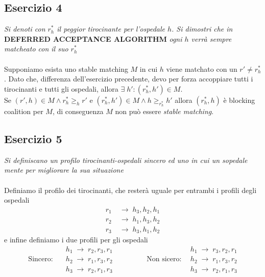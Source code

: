 \documentclass{article}
\begin{document}
        \subsection{Esercizio 4}
            \textit{Si denoti con $ r_h^* $ il peggior tirocinante per l'ospedale $ h $. Si dimostri che in} \textbf{DEFERRED ACCEPTANCE ALGORITHM} \textit{ogni $ h $ verrà sempre matcheato con il suo $ r_h^* $}\\
            \\
            Supponiamo esista uno stable matching $ M $ in cui $ h $ viene matchato con un $ r' \neq r_h^* $. Dato che, differenza dell'esercizio precedente, devo per forza accoppiare tutti i tirocinanti e tutti gli ospedali, allora $ \exists\; h' : (r_h^*, h') \in M $.\\
            Se $ (r', h) \in M \wedge r_h^* \geq_h r' $ e $ (r_h^*, h') \in M \wedge h \geq_{r_h^*} h' $ allora $ (r_h^*, h) $ è blocking coalition per $ M $, di conseguenza $ M $ non può essere \textit{stable matching}.
        \subsection{Esercizio 5}
            \textit{Si definiscano un profilo tirocinanti-ospedali sincero ed uno in cui un sopedale mente per migliorare la sua situazione}\\
            \\
            Definiamo il profilo dei tirocinanti, che resterà uguale per entrambi i profili degli ospedali
            \[
                \begin{aligned}
                    r_1\; &\rightarrow\; h_3, h_2, h_1 \\
                    r_2\; &\rightarrow\; h_1, h_3, h_2 \\
                    r_3\; &\rightarrow\; h_3, h_1, h_2 
                \end{aligned}  
            \]
            e infine definiamo i due profili per gli ospedali
            \[
                \begin{aligned}
                    &h_1\; \rightarrow\; r_2, r_3, r_1 \hspace{2cm} &h_1\; \rightarrow\; r_3, r_2, r_1 \\
                    \text{Sincero}:\quad &h_2\; \rightarrow\; r_1, r_3, r_2 \hspace{2cm} \text{Non sicero}:\;&h_2\; \rightarrow\; r_1, r_3, r_2 \\
                    &h_3\; \rightarrow\; r_2, r_1, r_3 \hspace{2cm} &h_3\; \rightarrow\; r_2, r_1, r_3
                \end{aligned}    
            \]
    \newpage
\end{document}
